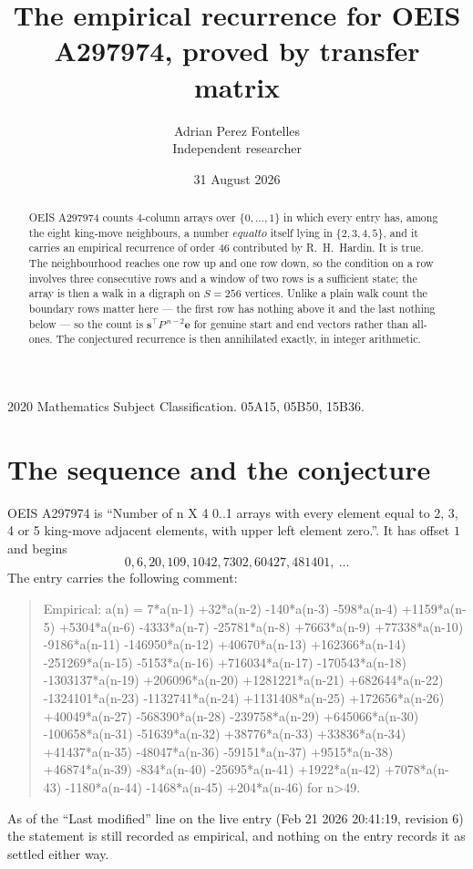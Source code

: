 \documentclass[11pt,a4paper]{article}
\title{The empirical recurrence for OEIS A297974, proved by transfer matrix}
\author{Adrian Perez Fontelles\\ \small Independent researcher}
\date{31 August 2026}
\theoremstyle{plain}
\theoremstyle{definition}
\begin{document}
\maketitle

\begin{abstract}
OEIS A297974 counts $4$-column arrays over $\{0,\dots,1\}$ in which every entry has,
among the eight king-move neighbours, a number $equal to$ itself lying in $\{2,3,4,5\}$, and it carries an empirical
recurrence of order $46$ contributed by R.~H.~Hardin. It is true. The neighbourhood
reaches one row up and one row down, so the condition on a row involves three consecutive
rows and a window of two rows is a sufficient state; the array is then a walk in a digraph
on $S=256$ vertices. Unlike a plain walk count the boundary rows matter here --- the first
row has nothing above it and the last nothing below --- so the count is
$\mathbf{s}^{\!\top}P^{\,n-2}\mathbf{e}$ for genuine start and end vectors rather than
all-ones. The conjectured recurrence is then annihilated exactly, in integer arithmetic.
\end{abstract}

\noindent\small 2020 Mathematics Subject Classification. 05A15, 05B50, 15B36.\normalsize

\section{The sequence and the conjecture}

OEIS A297974 is ``Number of n X 4 0..1 arrays with every element equal to 2, 3, 4 or 5 king-move adjacent elements, with upper left element zero.''. It has offset
$1$ and begins
\[
0, 6, 20, 109, 1042, 7302, 60427, 481401,\ \dots
\]
The entry carries the following comment:
\begin{quote}\small
Empirical: a(n) = 7*a(n-1) +32*a(n-2) -140*a(n-3) -598*a(n-4) +1159*a(n-5) +5304*a(n-6) -4333*a(n-7) -25781*a(n-8) +7663*a(n-9) +77338*a(n-10) -9186*a(n-11) -146950*a(n-12) +40670*a(n-13) +162366*a(n-14) -251269*a(n-15) -5153*a(n-16) +716034*a(n-17) -170543*a(n-18) -1303137*a(n-19) +206096*a(n-20) +1281221*a(n-21) +682644*a(n-22) -1324101*a(n-23) -1132741*a(n-24) +1131408*a(n-25) +172656*a(n-26) +40049*a(n-27) -568390*a(n-28) -239758*a(n-29) +645066*a(n-30) -100658*a(n-31) -51639*a(n-32) +38776*a(n-33) +33836*a(n-34) +41437*a(n-35) -48047*a(n-36) -59151*a(n-37) +9515*a(n-38) +46874*a(n-39) -834*a(n-40) -25695*a(n-41) +1922*a(n-42) +7078*a(n-43) -1180*a(n-44) -1468*a(n-45) +204*a(n-46) for n>49.
\end{quote}
As of the ``Last modified'' line on the live entry (Feb 21 2026 20:41:19, revision
6) the statement is still recorded as empirical, and nothing on the entry
records it as settled either way.
\end{document}
